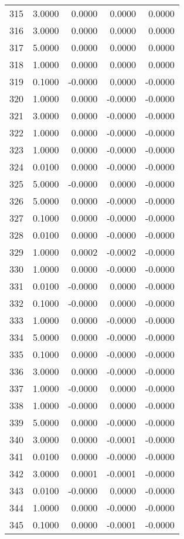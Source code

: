 \begin{longtable}{lrrrr}
315 & 3.0000 & 0.0000 & 0.0000 & 0.0000 \\
316 & 3.0000 & 0.0000 & 0.0000 & 0.0000 \\
317 & 5.0000 & 0.0000 & 0.0000 & 0.0000 \\
318 & 1.0000 & 0.0000 & 0.0000 & 0.0000 \\
319 & 0.1000 & -0.0000 & 0.0000 & -0.0000 \\
320 & 1.0000 & 0.0000 & -0.0000 & -0.0000 \\
321 & 3.0000 & 0.0000 & -0.0000 & -0.0000 \\
322 & 1.0000 & 0.0000 & -0.0000 & -0.0000 \\
323 & 1.0000 & 0.0000 & -0.0000 & -0.0000 \\
324 & 0.0100 & 0.0000 & -0.0000 & -0.0000 \\
325 & 5.0000 & -0.0000 & 0.0000 & -0.0000 \\
326 & 5.0000 & 0.0000 & -0.0000 & -0.0000 \\
327 & 0.1000 & 0.0000 & -0.0000 & -0.0000 \\
328 & 0.0100 & 0.0000 & -0.0000 & -0.0000 \\
329 & 1.0000 & 0.0002 & -0.0002 & -0.0000 \\
330 & 1.0000 & 0.0000 & -0.0000 & -0.0000 \\
331 & 0.0100 & -0.0000 & 0.0000 & -0.0000 \\
332 & 0.1000 & -0.0000 & 0.0000 & -0.0000 \\
333 & 1.0000 & 0.0000 & -0.0000 & -0.0000 \\
334 & 5.0000 & 0.0000 & -0.0000 & -0.0000 \\
335 & 0.1000 & 0.0000 & -0.0000 & -0.0000 \\
336 & 3.0000 & 0.0000 & -0.0000 & -0.0000 \\
337 & 1.0000 & -0.0000 & 0.0000 & -0.0000 \\
338 & 1.0000 & -0.0000 & 0.0000 & -0.0000 \\
339 & 5.0000 & 0.0000 & -0.0000 & -0.0000 \\
340 & 3.0000 & 0.0000 & -0.0001 & -0.0000 \\
341 & 0.0100 & 0.0000 & -0.0000 & -0.0000 \\
342 & 3.0000 & 0.0001 & -0.0001 & -0.0000 \\
343 & 0.0100 & -0.0000 & 0.0000 & -0.0000 \\
344 & 1.0000 & 0.0000 & -0.0000 & -0.0000 \\
345 & 0.1000 & 0.0000 & -0.0001 & -0.0000 \\

\end{longtable}
